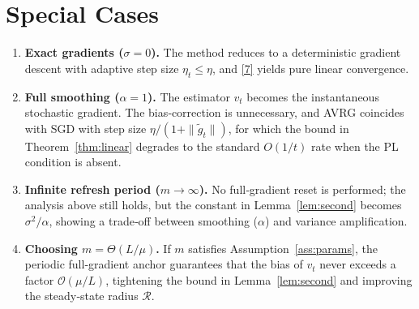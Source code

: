 \documentclass{article}
\begin{document}
\section*{Special Cases}
\begin{enumerate}[label=\alph*)]
\item \textbf{Exact gradients ($\sigma=0$).}
The method reduces to a deterministic gradient descent with adaptive step
size $\eta_t\le\eta$, and \eqref{7} yields pure linear convergence.

\item \textbf{Full smoothing ($\alpha=1$).}
The estimator $v_t$ becomes the instantaneous stochastic gradient.
The bias‑correction is unnecessary, and AVRG coincides with SGD
with step size $\eta/(1+\|\tilde g_t\|)$, for which the bound in
Theorem~\ref{thm:linear} degrades to the standard $O(1/t)$ rate
when the PL condition is absent.

\item \textbf{Infinite refresh period ($m\to\infty$).}
No full‑gradient reset is performed; the analysis above still holds,
but the constant in Lemma~\ref{lem:second} becomes $\sigma^{2}/\alpha$,
showing a trade‑off between smoothing ($\alpha$) and variance amplification.

\item \textbf{Choosing $m=\Theta(L/\mu)$.}
If $m$ satisfies Assumption~\ref{ass:params}, the periodic full‑gradient
anchor guarantees that the bias of $v_t$ never exceeds a factor
$\mathcal{O}(\mu/L)$, tightening the bound in Lemma~\ref{lem:second}
and improving the steady‑state radius $\mathcal{R}$.
\end{enumerate}

\end{document}
